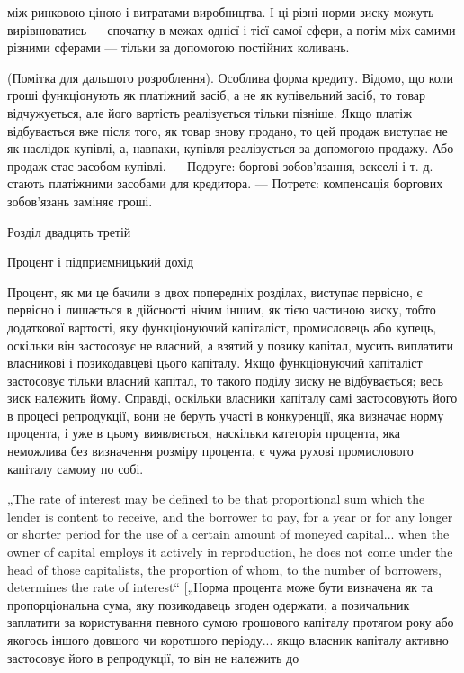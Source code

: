 \parcont{}  %
між ринковою ціною і витратами виробництва. І ці різні норми
зиску можуть вирівнюватись — спочатку в межах однієї і тієї
самої сфери, а потім між самими різними сферами — тільки за
допомогою постійних коливань.

(Помітка для дальшого розроблення). Особлива форма кредиту.
Відомо, що коли гроші функціонують як платіжний засіб,
а не як купівельний засіб, то товар відчужується, але його
вартість реалізується тільки пізніше. Якщо платіж відбувається
вже після того, як товар знову продано, то цей продаж виступає
не як наслідок купівлі, а, навпаки, купівля реалізується за
допомогою продажу. Або продаж стає засобом купівлі. — Подруге:
боргові зобов’язання, векселі і т. д. стають платіжними
засобами для кредитора. — Потретє: компенсація боргових зобов’язань
заміняє гроші.

Розділ двадцять третій

Процент і підприємницький дохід

Процент, як ми це бачили в двох попередніх розділах, виступає
первісно, є первісно і лишається в дійсності нічим
іншим, як тією частиною зиску, тобто додаткової вартості,
яку функціонуючий капіталіст, промисловець або купець,
оскільки він застосовує не власний, а взятий у позику капітал,
мусить виплатити власникові і позикодавцеві цього капіталу.
Якщо функціонуючий капіталіст застосовує тільки власний капітал,
то такого поділу зиску не відбувається; весь зиск належить
йому. Справді, оскільки власники капіталу самі застосовують
його в процесі репродукції, вони не беруть участі в
конкуренції, яка визначає норму процента, і уже в цьому виявляється,
наскільки категорія процента, яка неможлива без визначення
розміру процента, є чужа рухові промислового капіталу
самому по собі.

„The rate of interest may be defined to be that proportional sum
which the lender is content to receive, and the borrower to pay, for
a year or for any longer or shorter period for the use of a certain
amount of moneyed capital... when the owner of capital employs
it actively in reproduction, he does not come under the head of
those capitalists, the proportion of whom, to the number of borrowers,
determines the rate of interest“ [„Норма процента може
бути визначена як та пропорціональна сума, яку позикодавець
згоден одержати, а позичальник заплатити за користування певного
сумою грошового капіталу протягом року або якогось іншого
довшого чи коротшого періоду... якщо власник капіталу
активно застосовує його в репродукції, то він не належить до
\parbreak{}  %
